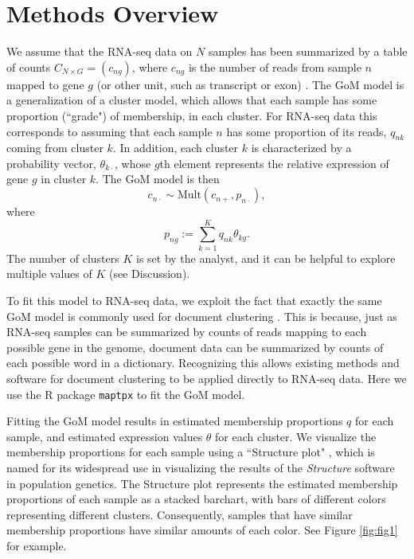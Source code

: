 \section{Methods Overview}

We assume that the RNA-seq data on $N$ samples has been summarized by a table of counts $C_{N \times G} = (c_{ng})$, 
where $c_{ng}$ is the number of reads from sample $n$ mapped to gene $g$ (or other unit, such as transcript or exon) \cite{Oshlack2010}.  
The GoM model is a generalization of a cluster model, which allows that each sample has some proportion (``grade") of membership,
in each cluster.  For RNA-seq data this corresponds to 
assuming that each sample $n$ has some proportion of its reads, $q_{nk}$ coming from cluster $k$. 
In addition, each cluster $k$ is characterized by a probability vector, $\theta_{k\cdot}$, whose $g$th element represents
the relative expression of gene $g$ in cluster $k$. 
The GoM model is then
\begin{equation} \label{eqn:mult}
c_{n\cdot} \sim \text{Mult}(c_{n+}, p_{n\cdot}),
\end{equation}
where
\begin{equation} \label{eqn:gom}
p_{ng} := \sum_{k=1}^{K} q_{nk}\theta_{kg}.    
\end{equation}
The number of clusters $K$ is set by the analyst, and it can be helpful to explore multiple
values of $K$ (see Discussion).

To fit this model to RNA-seq data, we exploit the fact that exactly the same GoM model is commonly used for document clustering \cite{Blei2003}.
This is because, just as RNA-seq samples can be summarized by counts of reads mapping to each possible gene in the genome, 
document data can be summarized by counts of each possible word in a dictionary.
Recognizing this allows existing methods and software for document clustering to be applied directly to RNA-seq data. 
Here we use the R package {\tt maptpx} \cite{Taddy2012} to fit the GoM model.

Fitting the GoM model results in estimated membership proportions $q$ for each sample, and estimated expression values $\theta$ for each cluster.
We visualize the membership proportions for each sample using a ``Structure plot" \cite{Rosenberg2002}, 
which is named for its widespread use in visualizing the
results of the {\it Structure} software \cite{Pritchard2000} in population genetics.
The Structure plot represents the estimated membership proportions of each sample 
as a stacked barchart, with bars of different colors representing  different clusters. Consequently, samples that have similar membership proportions have
similar amounts of each color. See Figure \ref{fig:fig1} for example.

